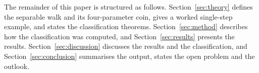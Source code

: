 The remainder of this paper is structured as follows.
Section~\ref{sec:theory} defines the separable walk and its
four-parameter coin, gives a worked single-step example, and
states the classification theorems. Section~\ref{sec:method}
describes how the classification was computed, and
Section~\ref{sec:results} presents the results.
Section~\ref{sec:discussion} discusses the results and the
classification, and Section~\ref{sec:conclusion} summarises
the output, states the open problem and the outlook.
